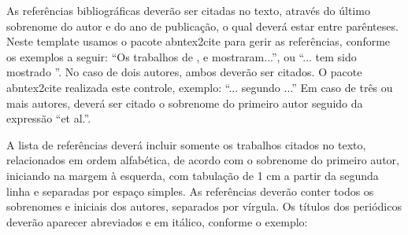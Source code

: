\documentclass[12pt,a4paper]{article}
\begin{document}
As referências bibliográficas deverão ser citadas no texto, através do último sobrenome do autor e do ano de publicação, o qual deverá estar entre parênteses. Neste template usamos o pacote abntex2cite para gerir as referências, conforme os exemplos a seguir: “Os trabalhos de ,  e  mostraram...”, ou “... tem sido mostrado \cite{Vasquez2000,Costa2000,Ferreira2016}”. No caso de dois autores, ambos deverão ser citados. O pacote abntex2cite realizada este controle, exemplo: “... segundo ...” Em caso de três ou mais autores, deverá ser citado o sobrenome do primeiro autor seguido da expressão “et al.”.

A lista de referências deverá incluir somente os trabalhos citados no texto, relacionados em ordem alfabética, de acordo com o sobrenome do primeiro autor, iniciando na margem à esquerda, com tabulação de 1 cm a partir da segunda linha e separadas por espaço simples. As referências deverão conter todos os sobrenomes e iniciais dos autores, separados por vírgula. Os títulos dos periódicos deverão aparecer abreviados e em itálico, conforme o exemplo: %
\begingroup
\renewcommand{\section}[2]{}%

\endgroup
\end{document}
